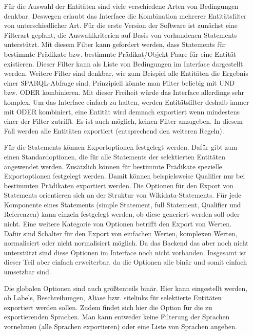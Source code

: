 Für die Auswahl der Entitäten sind viele verschiedene Arten von Bedingungen denkbar.
Deswegen erlaubt das Interface die Kombination mehrerer Entitätsfilter von unterschiedlicher Art.
Für die erste Version der Software ist zunächst eine Filterart geplant, die Auswahlkriterien auf Basis von vorhandenen Statements unterstützt. 
Mit diesem Filter kann gefordert werden, dass Statements für bestimmte Prädikate bzw. bestimmte Prädikat/Objekt-Paare für eine Entität existieren.
Dieser Filter kann als Liste von Bedingungen im Interface dargestellt werden.
Weitere Filter sind denkbar, wie zum Beispiel alle Entitäten die Ergebnis einer SPARQL-Abfrage sind.
Prinzipiell könnte man Filter beliebig mit UND bzw. ODER kombinieren.
Mit dieser Freiheit würde das Interface allerdings sehr komplex.
Um das Interface einfach zu halten, werden Entitätsfilter deshalb immer mit ODER kombiniert, eine Entität wird demnach exportiert wenn mindestens einer der Filter zutrifft.
Es ist auch möglich, keinen Filter anzugeben.
In diesem Fall werden alle Entitäten exportiert (entsprechend den weiteren Regeln).

Für die Statements können Exportoptionen festgelegt werden.
Dafür gibt zum einen Standardoptionen, die für alle Statements der selektierten Entitäten angewendet werden.
Zusätzlich können für bestimmte Prädikate spezielle Exportoptionen festgelegt werden.
Damit können beispielsweise Qualifier nur bei bestimmten Prädikaten exportiert werden.
Die Optionen für den Export von Statements orientieren sich an der Struktur von Wikidata-Statements.
Für jede Komponente eines Statements (simple Statement, full Statement, Qualifier und Referenzen) kann einzeln festgelegt werden, ob diese generiert werden soll oder nicht.
Eine weitere Kategorie von Optionen betrifft den Export von Werten.
Dafür sind Schalter für den Export von einfachen Werten, komplexen Werten, normalisiert oder nicht normalisiert möglich.
Da das Backend das aber noch nicht unterstützt sind diese Optionen im Interface noch nicht vorhanden.
Insgesamt ist dieser Teil aber einfach erweiterbar, da die Optionen alle binär und somit einfach umsetzbar sind.

Die globalen Optionen sind auch größtenteils binär.
Hier kann eingestellt werden, ob Labels, Beschreibungen, Aliase bzw. sitelinks für selektierte Entitäten exportiert werden sollen.
Zudem findet sich hier die Option für die zu exportierenden Sprachen.
Man kann entweder keine Filterung der Sprachen vornehmen (alle Sprachen exportieren) oder eine Liste von Sprachen angeben.

